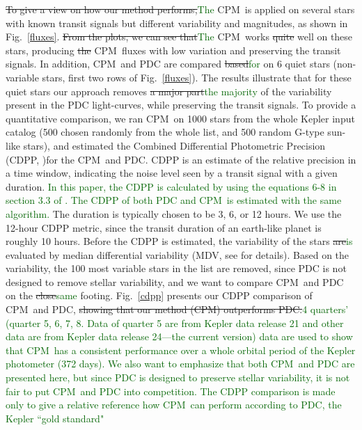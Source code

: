 \documentclass[12pt, preprint]{aastex}
\newcommand{\name}{CPM}
\newcommand{\revise}[1]{\textcolor{darkgreen}{#1}}
\newcommand{\remove}[1]{\sout{#1}}
\begin{document}
\remove{To give a view on how our method performs,}\revise{The} \name\ is applied on several stars with known transit signals but different variability and magnitudes, as shown in Fig.~\ref{fluxes}. 
\remove{From the plots, we can see that}\revise{The} \name\ works \remove{quite} well on these stars, producing \remove{the} \name\ fluxes 
with low variation and preserving the transit signals.
In addition, \name\ and PDC are compared \remove{based}\revise{for} on 6 quiet stars 
(non-variable stars, first two rows of Fig.~\ref{fluxes}). 
The results illustrate that for these quiet stars our approach removes 
\remove{a major part}\revise{the majority} of the variability present in the PDC light-curves, while preserving the transit signals. 
To provide a quantitative comparison, we ran \name\ on 1000 stars from the whole Kepler input catalog 
(500 chosen randomly from the whole list, and 500 random G-type sun-like stars), 
and estimated the Combined Differential Photometric Precision (CDPP,  \citealt{cdpp1} )for the \name\ and PDC.  
CDPP is an estimate of the relative precision in a time window, 
indicating the noise level seen by a transit signal with a given duration. 
\revise{In this paper, the CDPP is calculated by using the equations 6-8 in section 3.3 of \citep{cdpp1}. The CDPP of both PDC and \name\ is estimated with the same algorithm.} 
The duration is typically chosen to be 3, 6, or 12 hours. 
We use the 12-hour CDPP metric, since the transit duration of an earth-like planet is roughly 10 hours. 
Before the CDPP is estimated, the variability of the stars \remove{are}\revise{is} evaluated by median differential variability 
  (MDV, see \citealt{basri2013} for details). 
Based on the variability, the 100 most variable stars in the list are removed, 
  since PDC is not designed to remove stellar variability, 
  and we want to compare \name\ and PDC on the \remove{close}\revise{same} footing.
Fig.~\ref{cdpp} presents our CDPP comparison of \name\ and PDC, 
  \remove{showing that our method (\name) outperforms PDC.}\revise{4 quarters' (quarter 5, 6, 7, 8. Data of quarter 5 are from Kepler data release 21 and other data are from Kepler data release 24---the current version) data are used to show that \name\ has a consistent performance over a whole orbital period of the Kepler photometer (372 days). We also want to emphasize that both \name\ and PDC are presented here, but since PDC is designed to preserve stellar variability, it is not fair to put \name\ and PDC into competition. The CDPP comparison is made only to give a relative reference how \name\ can perform according to PDC, the Kepler ``gold standard"}
\end{document}
